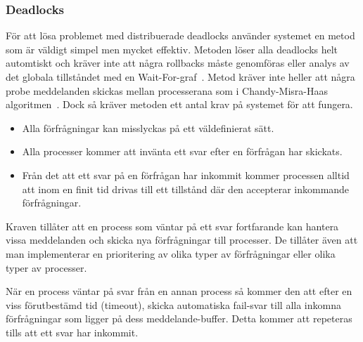 \documentclass[12pt]{article}
\begin{document}
\subsubsection{Deadlocks}
För att lösa problemet med distribuerade deadlocks använder systemet en metod som är väldigt simpel men mycket effektiv.
Metoden löser alla deadlocks helt automtiskt och kräver inte att några rollbacks måste genomföras eller analys av det globala tillståndet med en Wait-For-graf~\cite{krzyzanowski-ddeadlock}.
Metod kräver inte heller att några probe meddelanden skickas mellan processerana som i Chandy-Misra-Haas algoritmen~\cite{chandy1983distributed}.
Dock så kräver metoden ett antal krav på systemet för att fungera.
\begin{itemize}
    \item Alla förfrågningar kan misslyckas på ett väldefinierat sätt.
    \item Alla processer kommer att invänta ett svar efter en förfrågan har skickats.
    \item Från det att ett svar på en förfrågan har inkommit kommer processen alltid att inom en finit tid drivas till ett tillstånd där den accepterar inkommande förfrågningar.
\end{itemize}

Kraven tillåter att en process som väntar på ett svar fortfarande kan hantera vissa meddelanden och skicka nya förfrågningar till processer.
De tillåter även att man implementerar en prioritering av olika typer av förfrågningar eller olika typer av processer.

När en process väntar på svar från en annan process så kommer den att efter en viss förutbestämd tid (timeout),
skicka automatiska fail-svar till alla inkomna förfrågningar som ligger på dess meddelande-buffer.
Detta kommer att repeteras tills att ett svar har inkommit.
\end{document}

